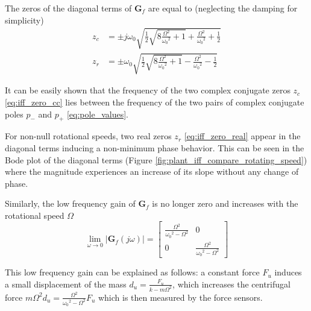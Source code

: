 \documentclass{ISMA_USD2020}
\begin{document}
The zeros of the diagonal terms of \(\bm{G}_f\) are equal to (neglecting the damping for simplicity)
\begin{subequations}
  \begin{align}
    z_c &= \pm j \omega_0 \sqrt{\frac{1}{2} \sqrt{8 \frac{\Omega^2}{{\omega_0}^2} + 1} + \frac{\Omega^2}{{\omega_0}^2} + \frac{1}{2} } \label{eq:iff_zero_cc} \\
    z_r &= \pm   \omega_0 \sqrt{\frac{1}{2} \sqrt{8 \frac{\Omega^2}{{\omega_0}^2} + 1} - \frac{\Omega^2}{{\omega_0}^2} - \frac{1}{2} } \label{eq:iff_zero_real}
  \end{align}
\end{subequations}

It can be easily shown that the frequency of the two complex conjugate zeros \(z_c\) \eqref{eq:iff_zero_cc} lies between the frequency of the two pairs of complex conjugate poles \(p_{-}\) and \(p_{+}\) \eqref{eq:pole_values}.

For non-null rotational speeds, two real zeros \(z_r\) \eqref{eq:iff_zero_real} appear in the diagonal terms inducing a non-minimum phase behavior.
This can be seen in the Bode plot of the diagonal terms (Figure \ref{fig:plant_iff_compare_rotating_speed}) where the magnitude experiences an increase of its slope without any change of phase.

Similarly, the low frequency gain of \(\bm{G}_f\) is no longer zero and increases with the rotational speed \(\Omega\)
\begin{equation}
\label{low_freq_gain_iff_plan}
  \lim_{\omega \to 0} \left| \bm{G}_f (j\omega) \right| = \begin{bmatrix}
  \frac{\Omega^2}{{\omega_0}^2 - \Omega^2} & 0 \\
  0  & \frac{\Omega^2}{{\omega_0}^2 - \Omega^2}
\end{bmatrix}
\end{equation}

This low frequency gain can be explained as follows: a constant force \(F_u\) induces a small displacement of the mass \(d_u = \frac{F_u}{k - m\Omega^2}\), which increases the centrifugal force \(m\Omega^2d_u = \frac{\Omega^2}{{\omega_0}^2 - \Omega^2} F_u\) which is then measured by the force sensors.
\end{document}
